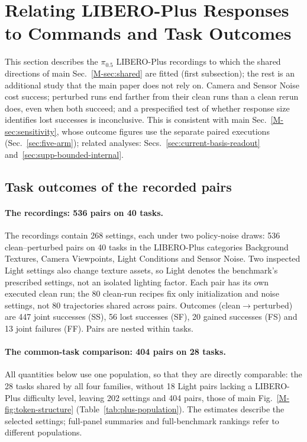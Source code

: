 \section{Relating LIBERO-Plus Responses to Commands and Task Outcomes}
\label{sec:supp-plus}

This section describes the $\pi_{0.5}$ LIBERO-Plus recordings to which the shared directions of main Sec.~\ref*{M-sec:shared} are fitted (first subsection); the rest is an additional study that the main paper does not rely on. Camera and Sensor Noise cost success; perturbed runs end farther from their clean runs than a clean rerun does, even when both succeed; and a prespecified test of whether response size identifies lost successes is inconclusive. This is consistent with main Sec.~\ref*{M-sec:sensitivity}, whose outcome figures use the separate paired executions (Sec.~\ref{sec:five-arm}); related analyses: Secs.~\ref{sec:current-basis-readout} and~\ref{sec:supp-bounded-internal}.

\subsection{Task outcomes of the recorded pairs}

\paragraph{The recordings: 536 pairs on 40 tasks.}
The recordings contain 268 settings, each under two policy-noise draws: 536 clean--perturbed pairs on 40 tasks in the LIBERO-Plus categories Background Textures, Camera Viewpoints, Light Conditions and Sensor Noise. Two inspected Light settings also change texture assets, so Light denotes the benchmark's prescribed settings, not an isolated lighting factor. Each pair has its own executed clean run; the 80 clean-run recipes fix only initialization and noise settings, not 80 trajectories shared across pairs. Outcomes (clean$\to$perturbed) are 447 joint successes (SS), 56 lost successes (SF), 20 gained successes (FS) and 13 joint failures (FF). Pairs are nested within tasks.

\paragraph{The common-task comparison: 404 pairs on 28 tasks.}
All quantities below use one population, so that they are directly comparable: the 28 tasks shared by all four families, without 18 Light pairs lacking a LIBERO-Plus difficulty level, leaving 202 settings and 404 pairs, those of main Fig.~\ref*{M-fig:token-structure} (Table~\ref{tab:plus-population}). The estimates describe the selected settings; full-panel summaries and full-benchmark rankings refer to different populations.

